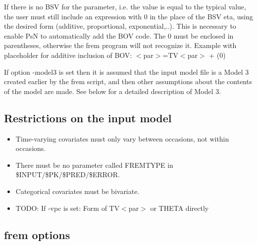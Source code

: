 If there is no BSV for the parameter, i.e. the value is equal to the typical value, the user must still include an expression with 0 in the place of the BSV eta, using the desired form (additive, proportional, exponential,..). This is necessary to enable PsN to automatically add the BOV code. The 0 must be enclosed in parentheses, otherwise the frem program will not recognize it. Example with placeholder for additive inclusion of BOV:
$<$par$>$=TV$<$par$>$ + (0)

If option -model3 is set then it is assumed that the input model file is a Model 3 created earlier by the frem script, and then other assumptions about the contents of the model are made. See below for a detailed description of Model 3.

\subsection{Restrictions on the input model}
\begin{itemize}
	\item Time-varying covariates must only vary between occasions, not within occasions. 
	\item There must be no parameter called FREMTYPE in \$INPUT/\$PK/\$PRED/\$ERROR.
	\item	Categorical covariates must be bivariate.
	\item TODO: If -vpc is set: Form of TV$<$par$>$ or THETA directly
\end{itemize}

\subsection{frem options}

